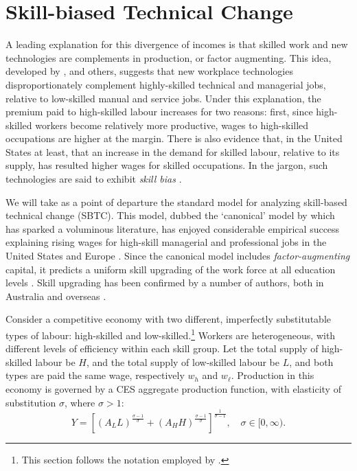 \documentclass[a4paper,11pt]{article}
\begin{document}
\section{Skill-biased Technical Change}

A leading explanation for this divergence of incomes is that skilled work and new technologies are complements in production, or factor augmenting. This idea, developed by \citet{Tinbergen1974}, \citet{Katz1992} and others, suggests that new workplace technologies disproportionately complement highly-skilled technical and managerial jobs, relative to low-skilled manual and service jobs. Under this explanation, the premium paid to high-skilled labour increases for two reasons: first, since high-skilled workers become relatively more productive, wages to high-skilled occupations are higher at the margin. There is also evidence that, in the United States at least, that an increase in the demand for skilled labour, relative to its supply, has resulted higher wages for skilled occupations. In the jargon, such technologies are said to exhibit \emph{skill bias} \citep{Autor2006}.

We will take as a point of departure the standard model for analyzing skill-based technical change (SBTC). This model, dubbed the `canonical' model by \citet{Acemoglu2011} which has sparked a voluminous literature, has enjoyed considerable empirical success explaining rising wages for high-skill managerial and professional jobs in the United States and Europe \citep{Katz1992}. Since the canonical model includes \emph{factor-augmenting} capital, it predicts a uniform skill upgrading of the work force at all education levels \citep{Levy2003}. Skill upgrading has been confirmed by a number of authors, both in Australia \citep{Esposto2012, Wooden2000, Cully1999} and overseas \citep{Autor2008}. 

Consider a competitive economy with two different, imperfectly substitutable types of labour: high-skilled and low-skilled.\footnote{This section follows the notation employed by \citet{Acemoglu2011}.} Workers are heterogeneous, with different levels of efficiency within each skill group. Let the total supply of high-skilled labour be $H$, and the total supply of low-skilled labour be $L$, and both types are paid the same wage, respectively $w_h$ and $w_\ell$. Production in this economy is governed by a CES aggregate production function, with elasticity of substitution $\sigma$, where $\sigma>1$:
\begin{equation}  \label{eq:prod}
Y = \left[
  \left(A_LL \right)^\frac{\sigma-1}{\sigma}
  +
  \left(A_HH \right)^\frac{\sigma-1}{\sigma}
  \right]^\frac{1}{\sigma-1},\quad \sigma \in [0,\infty).
\end{equation}
\end{document}
